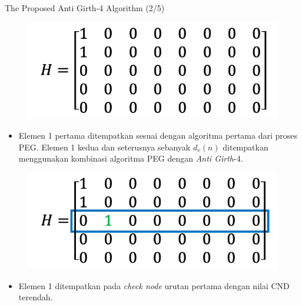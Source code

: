 \documentclass[11pt, aspectratio=169]{beamer}
\begin{document}
\begin{frame}{The Proposed Anti Girth-4 Algorithm (2/5)}
	\centering 
		\begin{figure}
			\centering 
			\includegraphics[scale=0.5]{gambarafa/step2}
			\centering 
		\end{figure}
		\begin{itemize}
			\item[2.] Elemen 1 pertama ditempatkan sesuai dengan algoritma pertama dari proses PEG. Elemen 1 kedua dan seterusnya sebanyak $d_v(n)$ ditempatkan menggunakan kombinasi algoritma PEG dengan \textit{Anti Girth}-4.
		\end{itemize}
	\centering 
	\begin{figure}
		\centering 
		\includegraphics[scale=0.5]{gambarafa/step3}
		\centering 
	\end{figure}
	\begin{itemize}
		\item[3.] Elemen 1 ditempatkan pada \textit{check node} urutan pertama dengan nilai CND terendah.
	\end{itemize}

\end{frame}
\end{document}

